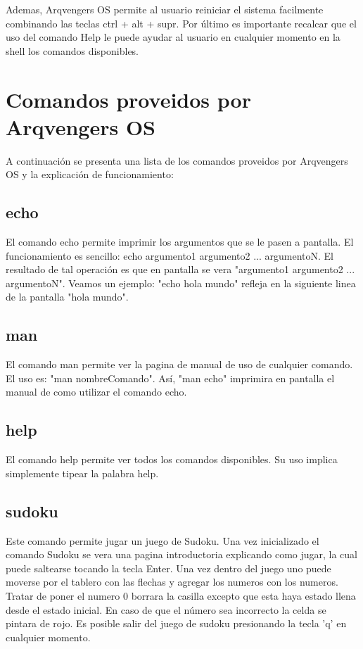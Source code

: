 \documentclass[a4paper,10pt]{article}
\begin{document}
\vspace{1cm}

Ademas, Arqvengers OS permite al usuario reiniciar el sistema facilmente combinando las teclas ctrl + alt + supr.
Por último es importante recalcar que el uso del comando Help le puede ayudar al usuario en cualquier momento en la shell los comandos disponibles.

\section{Comandos proveidos por Arqvengers OS}
    A continuación se presenta una lista de los comandos proveidos por Arqvengers OS y la explicación de funcionamiento:

    \subsection{echo}
       El comando echo permite imprimir los argumentos que se le pasen a pantalla.
       El funcionamiento es sencillo: echo argumento1 argumento2 ... argumentoN.
       El resultado de tal operación es que en pantalla se vera "argumento1 argumento2 ... argumentoN".
       Veamos un ejemplo:
       "echo hola mundo" refleja en la siguiente linea de la pantalla "hola mundo". 
    \subsection{man}
        El comando man permite ver la pagina de manual de uso de cualquier comando.
        El uso es: "man nombreComando".
        Así, "man echo" imprimira en pantalla el manual de como utilizar el comando echo.
    \subsection{help}
        El comando help permite ver todos los comandos disponibles. Su uso implica simplemente tipear la palabra help.
    \subsection{sudoku}
        Este comando permite jugar un juego de Sudoku.
        Una vez inicializado el comando Sudoku se vera una pagina introductoria explicando como jugar, la cual puede saltearse tocando la tecla Enter.
        Una vez dentro del juego uno puede moverse por el tablero con las flechas y agregar los numeros con los numeros. Tratar de poner el numero 0 borrara la casilla excepto que esta haya estado llena desde el estado inicial. En caso de que el número sea incorrecto la celda se pintara de rojo.
        Es posible salir del juego de sudoku presionando la tecla 'q' en cualquier momento.
\end{document}
